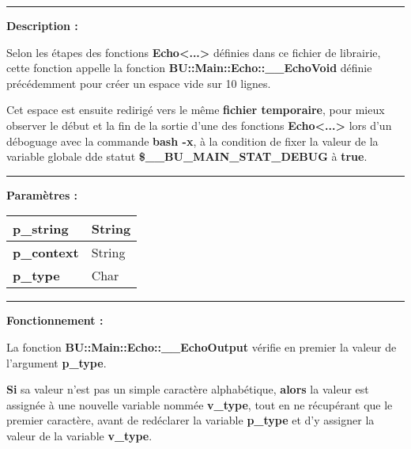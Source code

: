 \documentclass[a4paper,10pt]{article}
\begin{document}

\par\noindent\rule{\textwidth}{0.4pt}

\begin{justify}
    \textbf{Description :}

    Selon les étapes des fonctions \textbf{\color{func}Echo<...>} définies dans ce fichier de librairie, cette fonction appelle la fonction \textbf{\color{func}BU::Main::Echo::\_\_EchoVoid} définie précédemment pour créer un espace vide sur 10 lignes.

    Cet espace est ensuite redirigé vers le même \textbf{\color{path}fichier temporaire}, pour mieux observer le début et la fin de la sortie d'une des fonctions \textbf{\color{func}Echo<...>} lors d'un déboguage avec la commande \textbf{\color{cmds}bash -x}, à la condition de fixer la valeur de la variable globale dde statut \textbf{\color{vars}\$\_\_BU\_MAIN\_STAT\_DEBUG} à \textbf{true}.
\end{justify}


\par\noindent\rule{\textwidth}{0.4pt}

\begin{justify}
    \textbf{Paramètres :}

    \begin{tabular}{|l|l|}
        \hline
        \textbf{\color{vars}p\_string} & String\\
        \hline
        \textbf{\color{vars}p\_context} & String\\
        \hline
        \textbf{\color{vars}p\_type} & Char\\
        \hline
    \end{tabular}
\end{justify}

\setlength{\parskip}{2em}


\par\noindent\rule{\textwidth}{0.4pt}\setlength{\parskip}{1em}

\begin{justify}
    \textbf{Fonctionnement :}

    La fonction \textbf{\color{func}BU::Main::Echo::\_\_EchoOutput} vérifie en premier la valeur de l'argument \textbf{\color{vars}p\_type}.
\end{justify}

\begin{justify}
    \textbf{\color{cond}Si} sa valeur n'est pas un simple caractère alphabétique, \textbf{\color{cond}alors} la valeur est assignée à une nouvelle variable nommée \textbf{\color{vars}v\_type}, tout en ne récupérant que le premier caractère, avant de redéclarer la variable \textbf{\color{vars}p\_type} et d'y assigner la valeur de la variable \textbf{\color{vars}v\_type}.
\end{justify}
\end{document}
